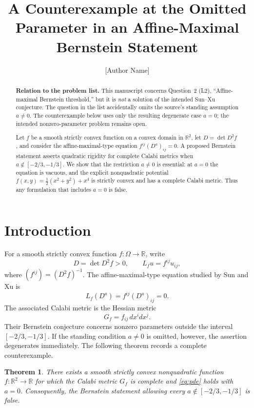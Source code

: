 \documentclass[11pt]{article}
\title{A Counterexample at the Omitted Parameter in an Affine-Maximal Bernstein Statement}
\author{[Author Name]}
\date{}
\newtheorem{theorem}{Theorem}
\theoremstyle{remark}
\begin{document}
\maketitle

\begin{abstract}
\textbf{Relation to the problem list.}
This manuscript concerns Question~2 (L2), ``Affine-maximal Bernstein
threshold,'' but it is \emph{not} a solution of the intended Sun--Xu
conjecture.  The question in the list accidentally omits the source's standing
assumption $a\ne0$.  The counterexample below uses only the resulting
degenerate case $a=0$; the intended nonzero-parameter problem remains open.

Let $f$ be a smooth strictly convex function on a convex domain in
$\mathbb R^2$, let $D=\det D^2f$, and consider the affine-maximal-type
equation $f^{ij}(D^a)_{ij}=0$.  A proposed Bernstein statement asserts
quadratic rigidity for complete Calabi metrics when
$a\notin[-2/3,-1/3]$.  We show that the restriction $a\ne0$ is essential:
at $a=0$ the equation is vacuous, and the explicit nonquadratic potential
$f(x,y)=\frac12(x^2+y^2)+x^4$ is strictly convex and has a complete Calabi
metric.  Thus any formulation that includes $a=0$ is false.
\end{abstract}

\section{Introduction}

For a smooth strictly convex function $f\colon\Omega\to\mathbb R$, write
\[
 D=\det D^2f>0,
 \qquad
 L_f u=f^{ij}u_{ij},
\]
where $(f^{ij})=(D^2f)^{-1}$.  The affine-maximal-type equation studied by
Sun and Xu \cite{SunXu} is
\begin{equation}\label{eq:pde}
 L_f(D^a)=f^{ij}(D^a)_{ij}=0.
\end{equation}
The associated Calabi metric is the Hessian metric
\begin{equation}\label{eq:calabi}
 G_f=f_{ij}\,dx^i dx^j.
\end{equation}
Their Bernstein conjecture concerns nonzero parameters outside the interval
$[-2/3,-1/3]$.  If the standing condition $a\ne0$ is omitted, however,
the assertion degenerates immediately.  The following theorem records a
complete counterexample.

\begin{theorem}\label{thm:main}
There exists a smooth strictly convex nonquadratic function
$f\colon\mathbb R^2\to\mathbb R$ for which the Calabi metric $G_f$ is
complete and \eqref{eq:pde} holds with $a=0$.  Consequently, the Bernstein
statement allowing every $a\notin[-2/3,-1/3]$ is false.
\end{theorem}
\end{document}
